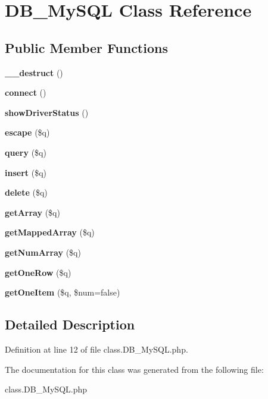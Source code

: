 \section{DB\_\-MySQL Class Reference}
\label{classDB__MySQL}
\subsection*{Public Member Functions}
\begin{CompactItemize}
\item 
{\bf \_\-\_\-destruct} ()\label{classDB__MySQL_897b77532d72230406f3df6aba60f14d}

\item 
{\bf connect} ()\label{classDB__MySQL_afc61e892fd14cba845169c6bf4b67bf}

\item 
{\bf showDriverStatus} ()\label{classDB__MySQL_24e407e566bdbd66c6636773d978d658}

\item 
{\bf escape} (\$q)\label{classDB__MySQL_807258386a394a1d8e46f40120b41000}

\item 
{\bf query} (\$q)\label{classDB__MySQL_90e695ae7c2540ec2b8da43ad2160159}

\item 
{\bf insert} (\$q)\label{classDB__MySQL_3544db3ceb0c25f7284f3e05df1df599}

\item 
{\bf delete} (\$q)\label{classDB__MySQL_d80a5b18115256343779a0f529743d6d}

\item 
{\bf getArray} (\$q)\label{classDB__MySQL_e9291be80a24f7b81d9533e84d2f2461}

\item 
{\bf getMappedArray} (\$q)\label{classDB__MySQL_34cfe70bcd1a591025a2ddbf496143bc}

\item 
{\bf getNumArray} (\$q)\label{classDB__MySQL_9eb41928cdec106731d6198e730f08df}

\item 
{\bf getOneRow} (\$q)\label{classDB__MySQL_db4af5316d2d51b14d18ba181e6202d9}

\item 
{\bf getOneItem} (\$q, \$num=false)\label{classDB__MySQL_1120f1b68242847be3cccfdf40154d64}

\end{CompactItemize}


\subsection{Detailed Description}


Definition at line 12 of file class.DB\_\-MySQL.php.

The documentation for this class was generated from the following file:\begin{CompactItemize}
\item 
class.DB\_\-MySQL.php\end{CompactItemize}

